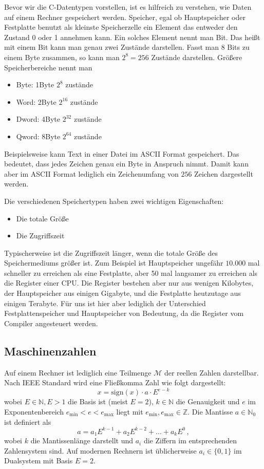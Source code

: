 Bevor wir die C-Datentypen vorstellen, ist es hilfreich zu verstehen, wie Daten auf einem Rechner gespeichert werden.
Speicher, egal ob Hauptspeicher oder Festplatte benutzt als kleinste Speicherzelle ein Element das entweder den Zustand 0 oder 1 annehmen kann.
Ein solches Element nennt man Bit.
Das heißt mit einem Bit kann man genau zwei Zustände darstellen.
Fasst man 8 Bits zu einem Byte zusammen, so kann man $2^8=256$ Zustände darstellen.
Größere Speicherbereiche nennt man
\begin{itemize}
\item Byte:  1Byte $2^{8 }$ zustände
\item Word:  2Byte $2^{16}$ zustände
\item Dword: 4Byte $2^{32}$ zustände
\item Qword: 8Byte $2^{64}$ zustände
\end{itemize}
Beispielsweise kann Text in einer Datei im ASCII Format gespeichert. 
Das bedeutet, dass jedes Zeichen genau ein Byte in Anspruch nimmt.
Damit kann aber im ASCII Format lediglich ein Zeichenumfang von $256$ Zeichen dargestellt werden.

Die verschiedenen Speichertypen haben zwei wichtigen Eigenschaften:
\begin{itemize}
\item Die totale Größe
\item Die Zugriffszeit
\end{itemize}
Typischerweise ist die Zugriffszeit länger, wenn die totale Größe des Speichermediums größer ist.
Zum Beispiel ist Hauptspeicher ungefähr $10.000$ mal schneller zu erreichen als eine Festplatte, aber 50 mal langsamer zu erreichen als die Register einer CPU.
Die Register bestehen aber nur aus wenigen Kilobytes, der Hauptspeicher aus einigen Gigabyte, und die Festplatte heutzutage aus einigen Terabyte.
Für uns ist hier aber lediglich der Unterschied Festplattenspeicher und Hauptspeicher von Bedeutung, da die Register vom Compiler angesteuert werden.

\subsection{Maschinenzahlen}

Auf einem Rechner ist lediglich eine Teilmenge $\mathcal{M}$ der
reellen Zahlen darstellbar. Nach IEEE Standard wird eine Fließkomma
Zahl wie folgt dargestellt:
\begin{equation}
x = \mathrm{sign}(x)\cdot a\cdot E^{e-k}
\end{equation}
wobei $E\in \mathbb{N}, E>1$ die Basis ist (meist $E=2$), $k\in
\mathbb{N}$ die 
Genauigkeit und $e$ im Exponentenbereich
$e_\mathrm{min}<e<e_\mathrm{max}$ liegt mit
$e_\mathrm{min},e_\mathrm{max}\in \mathbb{Z}$. Die Mantisse $a\in
\mathbb{N}_0$ ist 
definiert als
\begin{equation}
a = a_1 E^{k-1} + a_2 E^{k-2} + ... + a_k E^0\,,
\end{equation}
wobei $k$ die Mantissenlänge darstellt und $a_i$ die Ziffern im
entsprechenden Zahlensystem sind. Auf modernen Rechnern ist
üblicherweise $a_i\in\{0,1\}$ im Dualsystem mit Basis $E=2$.

